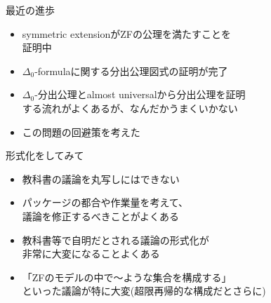 \documentclass[17pt,aspectratio=169]{beamer}
\begin{document}
\begin{frame} {最近の進歩}
    \begin{itemize}
        \item symmetric extensionがZFの公理を満たすことを\\証明中
        \item $\Delta_0$-formulaに関する分出公理図式の証明が完了
        \item $\Delta_0$-分出公理とalmost universalから分出公理を証明\\
              する流れがよくあるが、なんだかうまくいかない
        \item この問題の回避策を考えた
    \end{itemize}
\end{frame}

\begin{frame} {形式化をしてみて}
    \begin{itemize}
        \item 教科書の議論を丸写しにはできない
        \item パッケージの都合や作業量を考えて、\\議論を修正するべきことがよくある
        \item 教科書等で自明だとされる議論の形式化が\\非常に大変になることよくある
        \item 「ZFのモデルの中で～ような集合を構成する」\\といった議論が特に大変{\small (超限再帰的な構成だとさらに)}
    \end{itemize}
\end{frame}
\end{document}
